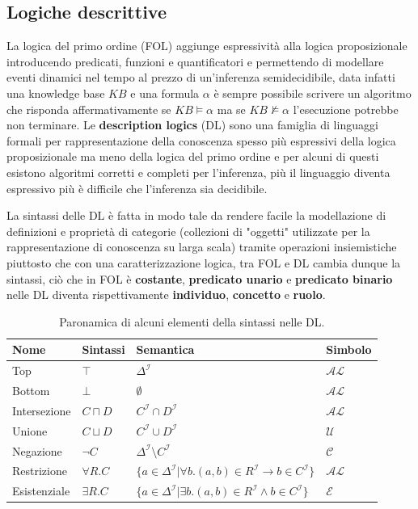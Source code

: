 \documentclass{article}
\begin{document}
\subsection{Logiche descrittive}
La logica del primo ordine (FOL) aggiunge espressività alla logica proposizionale introducendo predicati, funzioni e quantificatori e permettendo di modellare eventi dinamici nel tempo al prezzo di un'inferenza semidecidibile, data infatti una knowledge base $KB$ e una formula $\alpha$ è sempre possibile scrivere un algoritmo che risponda affermativamente se $KB \models \alpha$ ma se $KB \nvDash \alpha$ l'esecuzione potrebbe non terminare. Le \textbf{description logics} (DL) sono una famiglia di linguaggi formali per rappresentazione della conoscenza spesso più espressivi della logica proposizionale ma meno della logica del primo ordine e per alcuni di questi esistono algoritmi corretti e completi per l'inferenza, più il linguaggio diventa espressivo più è difficile che l'inferenza sia decidibile. 

La sintassi delle DL è fatta in modo tale da rendere facile la modellazione di definizioni e proprietà di categorie (collezioni di "oggetti" utilizzate per la rappresentazione di conoscenza su larga scala) tramite operazioni insiemistiche piuttosto che con una caratterizzazione logica, tra FOL e DL cambia dunque la sintassi, ciò che in FOL è \textbf{costante}, \textbf{predicato unario} e \textbf{predicato binario} nelle DL diventa rispettivamente \textbf{individuo}, \textbf{concetto} e \textbf{ruolo}.

\begin{table}[h!t] 
    \centering
    \begin{longtable}{p{}p{}p{}p{}}
        \textbf{Nome} & \textbf{Sintassi} & \textbf{Semantica} & \textbf{Simbolo} \\
        \hline
        Top & $\top$ & $\Delta^{\mathcal{I}}$ & $\mathcal{AL}$ \\
        Bottom & $\bot$ & $\emptyset$ & $\mathcal{AL}$\\
        Intersezione & $C \sqcap D$ & $C^{\mathcal{I}} \cap D^{\mathcal{I}}$ & $\mathcal{AL}$ \\
        Unione & $C \sqcup D$ & $C^{\mathcal{I}} \cup D^{\mathcal{I}}$ & $\mathcal{U}$ \\ 
        Negazione & $\neg C$ & $\Delta^{\mathcal{I}} \setminus C^{\mathcal{I}}$ & $\mathcal{C}$ \\
        Restrizione & $\forall R.C$ & 
        $\{ a \in \Delta^{\mathcal{I}} | \forall b.(a,b) \in R^{\mathcal{I}} \rightarrow b \in C^{\mathcal{I}} \}$ & $\mathcal{AL}$ \\
        Esistenziale & $\exists R.C$ & 
        $\{ a \in \Delta^{\mathcal{I}} | \exists b.(a,b) \in R^{\mathcal{I}} \land b \in C^{\mathcal{I}} \}$ & $\mathcal{E}$ \\
        \hline
    \end{longtable}
    \caption{Paronamica di alcuni elementi della sintassi nelle DL.}
    \label{tab:syntax_DL}
\end{table}
\end{document}
